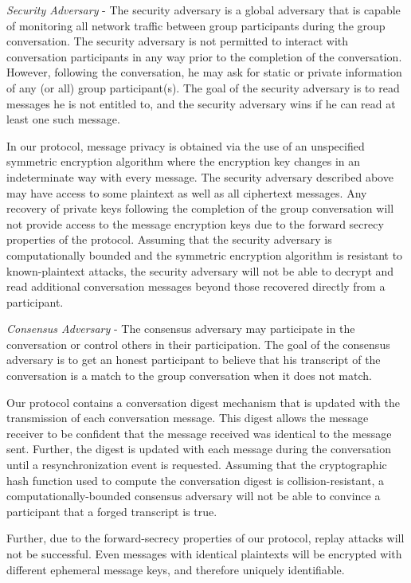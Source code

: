 \documentclass[%
preprint,
amsmath,amssymb,
aps,
prb,
floatfix,
]{revtex4-1}
\begin{document}
\textit{Security Adversary} - The security adversary is a global adversary that
is capable of monitoring all network traffic between group participants during
the group conversation.  The security adversary is not permitted to interact
with conversation participants in any way prior to the completion of the
conversation. However, following the conversation, he may ask for static or
private information of any (or all) group participant(s).
The goal of the security adversary is to read
messages he is not entitled to, and the security adversary wins if he can read
at least one such message.

In our protocol, message privacy is obtained via the use of an unspecified
symmetric encryption algorithm where the encryption key changes in an
indeterminate way with every message. The security adversary described
above may have access to some plaintext as well as all ciphertext messages.
Any recovery of private keys
following the completion of the group conversation will not provide access to
the message encryption keys due to the forward secrecy properties of the
protocol. Assuming that the security adversary is computationally bounded and
the symmetric encryption algorithm is resistant to known-plaintext attacks, the
security adversary will not be able to decrypt and read additional conversation
messages beyond those recovered directly from a participant.

\textit{Consensus Adversary} - The consensus adversary may participate in the
conversation or control others in their participation. The goal of the consensus
adversary is to get an honest participant to believe that his transcript of the
conversation is a match to the group conversation when it does not match.

Our protocol contains a conversation digest mechanism that is updated with the
transmission of each conversation message. This digest allows the message receiver to
be confident that the message received was identical to the message sent.
Further, the digest is updated with each message during the conversation until a
resynchronization event is requested. Assuming that the cryptographic hash
function used to compute the conversation digest is collision-resistant, a
computationally-bounded consensus adversary will not be able to convince a
participant that a forged transcript is true.

Further, due to the forward-secrecy properties of our protocol, replay attacks
will not be successful. Even messages with identical plaintexts will be
encrypted with different ephemeral message keys, and therefore uniquely
identifiable.
\end{document}

